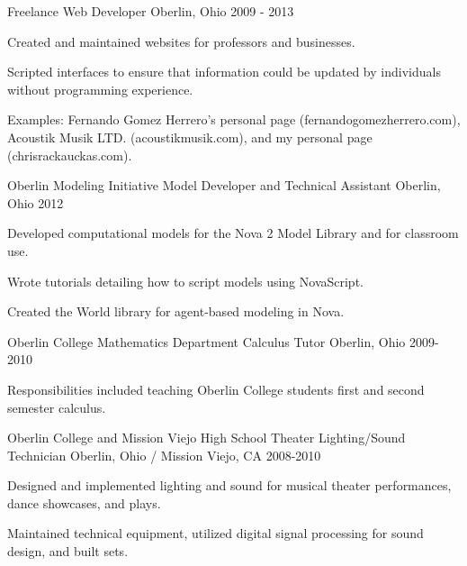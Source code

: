 \begin{cventries}
  \cventry
    {Freelance} %
    {Web Developer} %
    {Oberlin, Ohio} %
    {2009 - 2013} %
    {
      \begin{cvitems} %
        \item {Created and maintained websites for professors and businesses.}
        \item {Scripted interfaces to ensure that information could be updated by individuals without programming experience.}
        \item {Examples: Fernando Gomez Herrero’s personal page (fernandogomezherrero.com), Acoustik Musik LTD.
        	(acoustikmusik.com), and my personal page (chrisrackauckas.com).}
      \end{cvitems}
    }

  \cventry
    {Oberlin Modeling Initiative} %
    {Model Developer and Technical Assistant} %
    {Oberlin, Ohio} %
    {2012} %
    {
      \begin{cvitems} %
        \item {Developed computational models for the Nova 2 Model Library and for classroom use.}
        \item {Wrote tutorials detailing how to script models using NovaScript.}
        \item {Created the World library for agent-based modeling in Nova.}
      \end{cvitems}
    }

  \cventry
  {Oberlin College Mathematics Department} %
  {Calculus Tutor} %
  {Oberlin, Ohio} %
  {2009-2010} %
  {
  	\begin{cvitems} %
  		\item {Responsibilities included teaching Oberlin College students first and second semester calculus.}
  	\end{cvitems}
  }
  
  
\cventry
    {Oberlin College and Mission Viejo High School Theater} %
    {Lighting/Sound Technician} %
    {Oberlin, Ohio / Mission Viejo, CA} %
    {2008-2010} %
    {
    	\begin{cvitems} %
    		\item {Designed and implemented lighting and sound for musical theater performances, dance showcases, and plays.}
    		\item {Maintained technical equipment, utilized digital signal processing for sound design, and built sets.}
    	\end{cvitems}
    }
    
\end{cventries}
